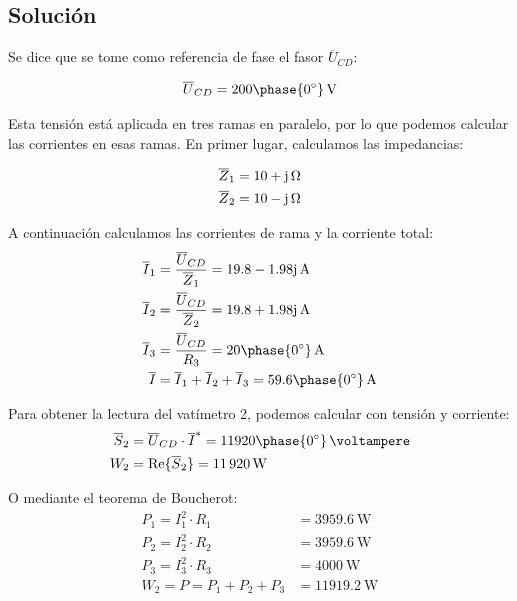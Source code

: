  

\subsection*{Solución}

Se dice que se tome como referencia de fase el fasor
$\overline{U}_{CD}$:

  \begin{equation*}
    \overline{U}_{CD} = 200\phase{\ang{0}}\,\si{\volt}
  \end{equation*}

  
  Esta tensión está aplicada en tres ramas en paralelo, por lo que podemos calcular las corrientes en esas ramas. En primer lugar, calculamos las impedancias:

\begin{align*}
\overline{Z}_1 &= \qty[parse-numbers=false]{10 + \mathrm{j}}{\ohm}\\
%
\overline{Z}_2 &= \qty[parse-numbers=false]{10 - \mathrm{j}}{\ohm}
\end{align*}

A continuación calculamos las corrientes de rama y la corriente total:
\begin{align*}
\overline{I}_1 &= \frac{\overline{U}_{CD}}{\overline{Z}_1} = \qty[parse-numbers=false]{19.8 - 1.98\mathrm{j}}{\ampere}\\
%
\overline{I}_2 &= \frac{\overline{U}_{CD}}{\overline{Z}_2} = \qty[parse-numbers=false]{19.8 + 1.98\mathrm{j}}{\ampere}\\
%
\overline{I}_3 &= \frac{\overline{U}_{CD}}{R_3} = 20\phase{\ang{0}}\,\si{\ampere}\\
%
\overline{I} &= \overline{I}_1 + \overline{I}_2 + \overline{I}_3 =  59.6\phase{\ang{0}}\,\si{\ampere}\\
\end{align*}

Para obtener la lectura del vatímetro 2, podemos calcular con tensión y corriente:
  \begin{align*}
\overline{S}_2 &= \overline{U}_{CD} \cdot \overline{I}^* = 11920\phase{\ang{0}}\,\si{\voltampere}\\
%
W_2 &= \mathrm{Re}\{\overline{S}_2\} = \qty{11920}{\watt}
\end{align*}

O mediante el teorema de Boucherot:
\begin{align*}
  P_1 = I_1^2 \cdot R_1 &= \qty{3959.6}{\watt}\\
  P_2 = I_2^2 \cdot R_2 &= \qty{3959.6}{\watt}\\
  P_3 = I_3^2 \cdot R_3 &= \qty{4000}{\watt}\\
  W_2 = P = P_1 + P_2 + P_3 &= \qty{11919.2}{\watt}
\end{align*}

